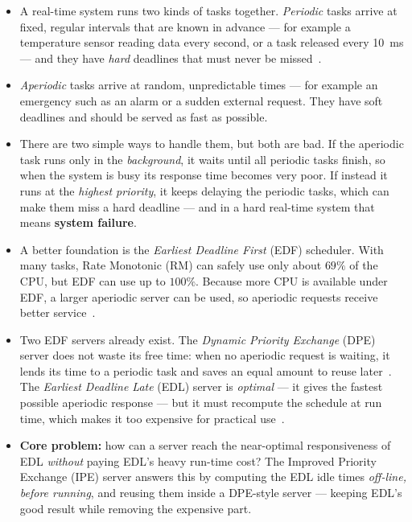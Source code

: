 \documentclass[conference]{IEEEtran}
\begin{document}
\begin{itemize}
  \item A real-time system runs two kinds of tasks together. \emph{Periodic}
        tasks arrive at fixed, regular intervals that are known in advance ---
        for example a temperature sensor reading data every second, or a task
        released every 10~ms --- and they have \emph{hard} deadlines that must
        never be missed~\cite{buttazzo}.
  \item \emph{Aperiodic} tasks arrive at random, unpredictable times --- for
        example an emergency such as an alarm or a sudden external request.
        They have soft deadlines and should be served as fast as possible.
  \item There are two simple ways to handle them, but both are bad. If the
        aperiodic task runs only in the \emph{background}, it waits until all
        periodic tasks finish, so when the system is busy its response time
        becomes very poor. If instead it runs at the \emph{highest priority},
        it keeps delaying the periodic tasks, which can make them miss a hard
        deadline --- and in a hard real-time system that means \textbf{system
        failure}.
  \item A better foundation is the \emph{Earliest Deadline First} (EDF)
        scheduler. With many tasks, Rate Monotonic (RM) can safely use only
        about $69\%$ of the CPU, but EDF can use up to $100\%$. Because more
        CPU is available under EDF, a larger aperiodic server can be used, so
        aperiodic requests receive better service~\cite{buttazzo}.
  \item Two EDF servers already exist. The \emph{Dynamic Priority Exchange}
        (DPE) server does not waste its free time: when no aperiodic request
        is waiting, it lends its time to a periodic task and saves an equal
        amount to reuse later~\cite{spuri1996}. The \emph{Earliest Deadline
        Late} (EDL) server is \emph{optimal} --- it gives the fastest possible
        aperiodic response --- but it must recompute the schedule at run time,
        which makes it too expensive for practical use~\cite{spuri1994}.
  \item \textbf{Core problem:} how can a server reach the near-optimal
        responsiveness of EDL \emph{without} paying EDL's heavy run-time cost?
        The Improved Priority Exchange (IPE) server answers this by computing
        the EDL idle times \emph{off-line, before running}, and reusing them
        inside a DPE-style server --- keeping EDL's good result while removing
        the expensive part.
\end{itemize}
\end{document}
